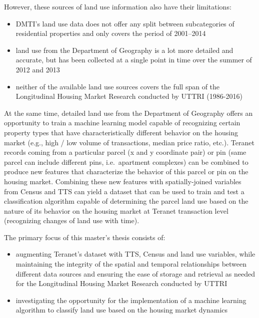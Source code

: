 \vspace{5mm}

However, these sources of land use information also have their limitations:
\begin{itemize}
    \item DMTI's land use data does not offer any split between subcategories of residential properties and only covers the period of 2001--2014
    \item land use from the Department of Geography is a lot more detailed and accurate, but has been collected at a single point in time over the summer of 2012 and 2013
    \item neither of the available land use sources covers the full span of the Longitudinal Housing Market Research conducted by UTTRI (1986-2016)
\end{itemize}

At the same time, detailed land use from the Department of Geography offers an opportunity to train a machine learning model capable of recognizing certain property types that have characteristically different behavior on the housing market (e.g., high / low volume of transactions, median price ratio, etc.).
Teranet records coming from a particular parcel (x and y coordinate pair) or pin (same parcel can include different pins, i.e.\ apartment complexes) can be combined to produce new features that characterize the behavior of this parcel or pin on the housing market.
Combining these new features with spatially-joined variables from Census and TTS can yield a dataset that can be used to train and test a classification algorithm capable of determining the parcel land use based on the nature of its behavior on the housing market at Teranet transaction level (recognizing changes of land use with time).

\vspace{5mm}

The primary focus of this master's thesis consists of:

\begin{itemize}
    \item augmenting Teranet's dataset with TTS, Census and land use variables, while maintaining the integrity of the spatial and temporal relationships between different data sources and ensuring the ease of storage and retrieval as needed for the Longitudinal Housing Market Research conducted by UTTRI
    \item investigating the opportunity for the implementation of a machine learning algorithm to classify land use based on the housing market dynamics
\end{itemize}

